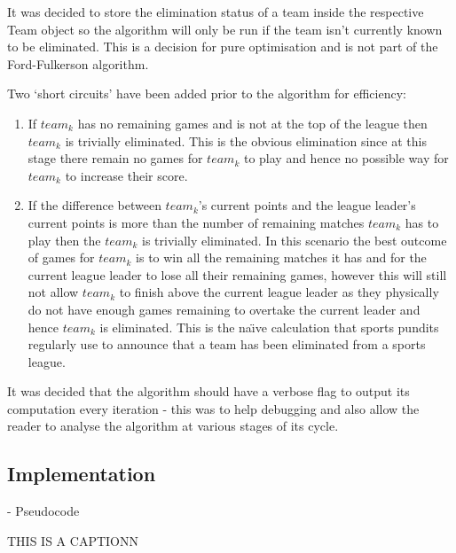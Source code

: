 It was decided to store the elimination status of a team inside the
respective Team object so the algorithm will only be run if the team isn't
currently known to be eliminated. This is a decision for pure optimisation and 
is not part of the Ford-Fulkerson algorithm.

Two `short circuits' have been added prior to the algorithm for efficiency:
\begin{enumerate}
\item If $team_k$ has no remaining games and is not at the top of the league
then $team_k$ is trivially eliminated. This is the obvious elimination since
at this stage there remain no games for $team_k$ to play and hence no possible
way for $team_k$ to increase their score.
\item If the difference between $team_k$'s current points and the league 
leader's current points is more than the number of remaining matches $team_k$ 
has to play then the $team_k$ is trivially eliminated. In this scenario the best 
outcome of games for $team_k$ is to win all the remaining matches it has and for 
the current league leader to lose all their remaining games, however this will
still not allow $team_k$ to finish above the current league leader as they
physically do not have enough games remaining to overtake the current leader and 
hence $team_k$ is eliminated. This is the na\"{\i}ve calculation that sports 
pundits regularly use to announce that a team has been eliminated from a sports 
league.
\end{enumerate}

It was decided that the algorithm should have a verbose flag to output
its computation every iteration - this was to help debugging and also
allow the reader to analyse the algorithm at various stages of its
cycle. 

\subsection{Implementation}

- Pseudocode



\begin{algorithm}[H]
  \SetAlgoLined
    
    
   
   
  \caption{THIS IS A CAPTIONN}
\end{algorithm}

